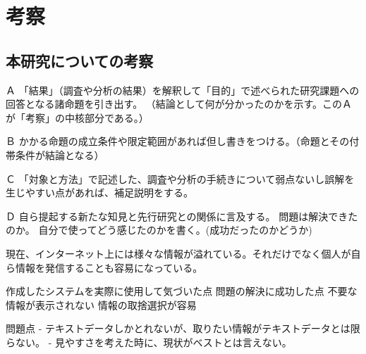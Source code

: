 \chapter{考察}
\label{chap:consideration}

\section{本研究についての考察}
Ａ 「結果」（調査や分析の結果）を解釈して「目的」で述べられた研究課題への回答となる諸命題を引き出す。
（結論として何が分かったのかを示す。このＡが「考察」の中核部分である。）

Ｂ かかる命題の成立条件や限定範囲があれば但し書きをつける。（命題とその付帯条件が結論となる）

Ｃ 「対象と方法」で記述した、調査や分析の手続きについて弱点ないし誤解を生じやすい点があれば、補足説明をする。

Ｄ 自ら提起する新たな知見と先行研究との関係に言及する。
問題は解決できたのか。
自分で使ってどう感じたのかを書く。(成功だったのかどうか)

現在、インターネット上には様々な情報が溢れている。それだけでなく個人が自ら情報を発信することも容易になっている。

作成したシステムを実際に使用して気づいた点
問題の解決に成功した点
不要な情報が表示されない
情報の取捨選択が容易

問題点
- テキストデータしかとれないが、取りたい情報がテキストデータとは限らない。
- 見やすさを考えた時に、現状がベストとは言えない。
